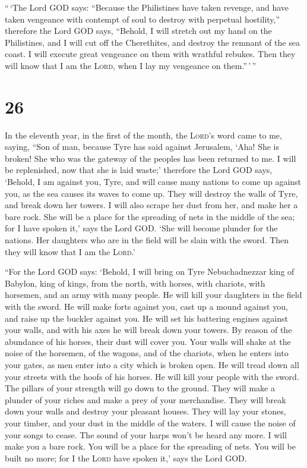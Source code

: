  ``\,`The Lord GOD says: ``Because the Philistines have
taken revenge, and have taken vengeance with contempt of soul to destroy
with perpetual hostility,''  therefore the Lord GOD says,
``Behold, I will stretch out my hand on the Philistines, and I will cut
off the Cherethites, and destroy the remnant of the sea coast.
 I will execute great vengeance on them with wrathful
rebukes. Then they will know that I am the \textsc{Lord}, when I lay my
vengeance on them.''\,'\,''

\hypertarget{section-25}{%
\section{26}\label{section-25}}

 In the eleventh year, in the first of the month, the
\textsc{Lord}'s word came to me, saying,  ``Son of man,
because Tyre has said against Jerusalem, `Aha! She is broken! She who
was the gateway of the peoples has been returned to me. I will be
replenished, now that she is laid waste;'  therefore the
Lord GOD says, `Behold, I am against you, Tyre, and will cause many
nations to come up against you, as the sea causes its waves to come up.
 They will destroy the walls of Tyre, and break down her
towers. I will also scrape her dust from her, and make her a bare rock.
 She will be a place for the spreading of nets in the
middle of the sea; for I have spoken it,' says the Lord GOD. `She will
become plunder for the nations.  Her daughters who are in
the field will be slain with the sword. Then they will know that I am
the \textsc{Lord}.'

 ``For the Lord GOD says: `Behold, I will bring on Tyre
Nebuchadnezzar king of Babylon, king of kings, from the north, with
horses, with chariots, with horsemen, and an army with many people.
 He will kill your daughters in the field with the sword.
He will make forts against you, cast up a mound against you, and raise
up the buckler against you.  He will set his battering
engines against your walls, and with his axes he will break down your
towers.  By reason of the abundance of his horses, their
dust will cover you. Your walls will shake at the noise of the horsemen,
of the wagons, and of the chariots, when he enters into your gates, as
men enter into a city which is broken open.  He will
tread down all your streets with the hoofs of his horses. He will kill
your people with the sword. The pillars of your strength will go down to
the ground.  They will make a plunder of your riches and
make a prey of your merchandise. They will break down your walls and
destroy your pleasant houses. They will lay your stones, your timber,
and your dust in the middle of the waters.  I will cause
the noise of your songs to cease. The sound of your harps won't be heard
any more.  I will make you a bare rock. You will be a
place for the spreading of nets. You will be built no more; for I the
\textsc{Lord} have spoken it,' says the Lord GOD.

